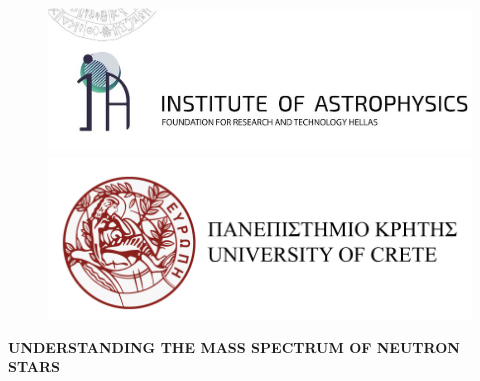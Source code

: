 \documentclass[a4paper, 10pt, twoside]{book}
\def\title{UNDERSTANDING THE MASS SPECTRUM OF NEUTRON STARS}
\begin{document}
    \frontmatter  %
    


    
    \begin{titlepage}
    	\begin{figure}[!t]
        
    		\begin{minipage}{.5\textwidth}    
            	\includegraphics[scale=0.2]{figures/iaforth_logo.jpeg}
    		\end{minipage}%
    		\begin{minipage}{0.5\textwidth}
        		\hspace{2.0cm} \includegraphics[scale=0.21]{figures/uoc_logo.png}
		    \end{minipage}
	\end{figure}
	
        \begin{center} 
            \vspace*{2.5cm}
            \LARGE \bfseries \title 
            \vspace{3cm}
            

\end{center}
\end{titlepage}
\end{document}
